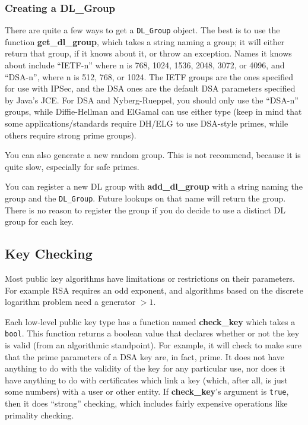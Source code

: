 \documentclass{article}
\newcommand{\function}[1]{\textbf{#1}}
\newcommand{\type}[1]{\texttt{#1}}
\begin{document}
\subsubsection{Creating a DL\_Group}

There are quite a few ways to get a \type{DL\_Group} object. The best is to use
the function \function{get\_dl\_group}, which takes a string naming a group; it
will either return that group, if it knows about it, or throw an
exception. Names it knows about include ``IETF-n'' where n is 768, 1024, 1536,
2048, 3072, or 4096, and ``DSA-n'', where n is 512, 768, or 1024. The IETF
groups are the ones specified for use with IPSec, and the DSA ones are the
default DSA parameters specified by Java's JCE. For DSA and Nyberg-Rueppel, you
should only use the ``DSA-n'' groups, while Diffie-Hellman and ElGamal can use
either type (keep in mind that some applications/standards require DH/ELG to
use DSA-style primes, while others require strong prime groups).

You can also generate a new random group. This is not recommend, because it is
quite slow, especially for safe primes.

You can register a new DL group with \function{add\_dl\_group} with a string
naming the group and the \type{DL\_Group}. Future lookups on that name will
return the group. There is no reason to register the group if you do decide to
use a distinct DL group for each key.

\subsection{Key Checking}

Most public key algorithms have limitations or restrictions on their
parameters. For example RSA requires an odd exponent, and algorithms based on
the discrete logarithm problem need a generator $> 1$.

Each low-level public key type has a function named \function{check\_key} which
takes a \type{bool}. This function returns a boolean value that declares
whether or not the key is valid (from an algorithmic standpoint). For example,
it will check to make sure that the prime parameters of a DSA key are, in fact,
prime. It does not have anything to do with the validity of the key for any
particular use, nor does it have anything to do with certificates which link a
key (which, after all, is just some numbers) with a user or other entity. If
\function{check\_key}'s argument is \type{true}, then it does ``strong''
checking, which includes fairly expensive operations like primality checking.
\end{document}

